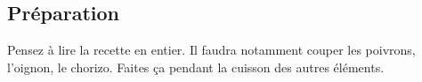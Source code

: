 \subsection*{Préparation}
Pensez à lire la recette en entier. Il faudra notamment couper les poivrons, l'oignon, le chorizo. Faites ça pendant la cuisson des autres éléments.

